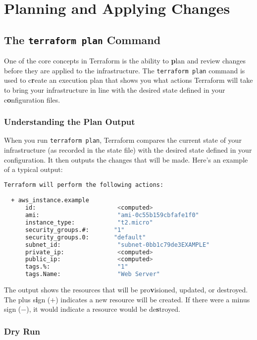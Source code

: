 \chapter{Planning and Applying Changes}
\sloppy

\section{The \texttt{terraform plan} Command}

One of the core concepts in Terraform is the ability to \textbf{p}lan and review changes before they are applied to the infrastructure. The \texttt{terraform plan} command is used to c\textbf{r}eate an execution plan that shows you what actions Terraform will take to bring your infrastructure in line with the desired state defined in your c\textbf{o}nfiguration files.

\subsection{Understanding the Plan Output}

When you run \texttt{terraform plan}, Terraform compares the current state of your infrastructure (as recorded in the state file) with the desired state defined in your configuration. It then outputs the changes that will be made. Here's an example of a typical output:

\begin{lstlisting}[language=bash]
Terraform will perform the following actions:

  + aws_instance.example
      id:                       <computed>
      ami:                      "ami-0c55b159cbfafe1f0"
      instance_type:            "t2.micro"
      security_groups.#:       "1"
      security_groups.0:       "default"
      subnet_id:                "subnet-0bb1c79de3EXAMPLE"
      private_ip:               <computed>
      public_ip:                <computed>
      tags.%:                   "1"
      tags.Name:                "Web Server"
\end{lstlisting}

The output shows the resources that will be pro\textbf{v}isioned, updated, or destroyed. The plus s\textbf{i}gn (\(+\)) indicates a new resource will be created. If there were a minus sign (\(-\)), it would indicate a resource would be de\textbf{s}troyed.

\subsection{Dry Run}

